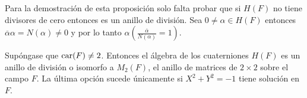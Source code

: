\begin{proof*}
Para la demostración de esta proposición solo falta probar que si $H(F)$ no tiene divisores de cero entonces es un anillo de división. Sea $0 \neq \alpha \in H(F)$ entonces $\overline{\alpha}\alpha = N(\alpha) \neq 0$ y por lo tanto $\alpha\left( \frac{\overline{\alpha}}{N(\alpha)} = 1\right)$.
\end{proof*}

\begin{teorema}\label{teo:caracterizacion}
Supóngase que $\operatorname{car}(F) \neq 2$. Entonces el álgebra de los cuaterniones $H(F)$ es un anillo de división o isomorfo a $M_2(F)$, el anillo de matrices de $2\times 2$ sobre el campo $F$. La última opción sucede únicamente si $X^2 + Y^2 = -1$ tiene solución en $F$.
\end{teorema}

